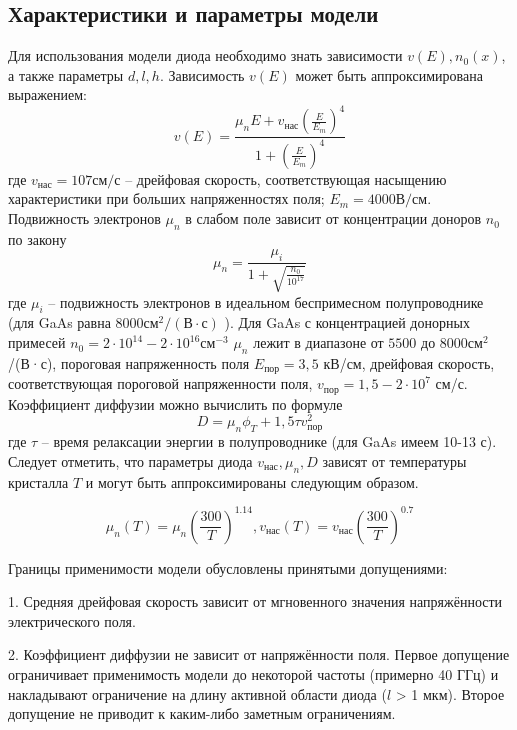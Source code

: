 \documentclass[a4paper, 12pt]{article}
\begin{document}
\subsection{Характеристики и параметры модели}
Для использования модели диода необходимо знать зависимости $v(E), n_0(x)$,
а также параметры $d, l, h$. Зависимость $v(E)$ может быть аппроксимирована
выражением:
\[v(E) = \frac{\mu_nE + v_{\text{нас}}\left(\frac{E}{E_m}\right)^4}{1 + \left(\frac{E}{E_m}\right)^4}\]
где $v_{\text{нас}} = 107 \text{см/с}$ – дрейфовая скорость, соответствующая насыщению
характеристики при больших напряженностях поля; $E_m=4000 \text{В/см}$.
Подвижность электронов $\mu_n$ в слабом поле зависит от концентрации
доноров $n_0$ по закону
\[\mu_n = \frac{\mu_i}{1+\sqrt{\frac{n_0}{10^{17}}}}\]
где $\mu_i$ – подвижность электронов в идеальном беспримесном полупроводнике (для
GaAs равна $8000 \text{см}^2/(\text{В}\cdot \text{с})$ ).
Для GaAs с концентрацией донорных примесей $n_0=2\cdot10^{14} - 2\cdot10^{16}\text{см}^{-3}$
$\mu_n$ лежит в диапазоне от $5500$ до $8000 \text{см}^2$/(В·с), пороговая напряженность
поля $E_{\text{пор}} = 3,5$ кВ/см, дрейфовая скорость, соответствующая пороговой
напряженности поля, $v_{\text{пор}}=1,5-2\cdot10^7$ см/с.
Коэффициент диффузии можно вычислить по формуле
\[D = \mu_n \phi_T + 1,5\tau v^2_{\text{пор}}\]
где $\tau$ – время релаксации энергии в полупроводнике (для GaAs имеем 10-13 с).
Следует отметить, что параметры диода $v_{\text{нас}}, \mu_n, D$ зависят от температуры
кристалла $T$ и могут быть аппроксимированы следующим образом.

\[\mu_n(T) = \mu_n \left(\frac{300}{T}\right)^{1.14}, v_{\text{нас}}(T) =  v_{\text{нас}} \left(\frac{300}{T}\right)^{0.7}\]

Границы применимости модели обусловлены принятыми допущениями:

1. Средняя дрейфовая скорость зависит от мгновенного значения
напряжённости электрического поля.

2. Коэффициент диффузии не зависит от напряжённости поля.
Первое допущение ограничивает применимость модели до некоторой
частоты (примерно 40 ГГц) и накладывают ограничение на длину активной
области диода ($l$ > 1 мкм). Второе допущение не приводит к каким-либо заметным
ограничениям.
\end{document}
